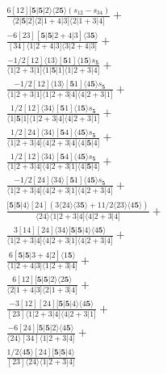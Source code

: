 \documentclass[varwidth, border=5pt]{standalone}
\begin{document}
\begin{my}
$\begin{gathered}
\scriptscriptstyle\frac{6[12][𝟓|𝟓|2⟩⟨2𝟓⟩(s_{12}-s_{34})}{⟨2|𝟓|2]⟨2|1+4|3]⟨2|1+3|4]} +\\
\scriptscriptstyle\frac{-6[23][𝟓|𝟓|2+4|3]⟨3𝟓⟩}{[34]⟨1|2+4|3]⟨3|2+4|3]} +\\
\scriptscriptstyle\frac{-1/2[12]⟨13⟩[𝟓1]⟨1𝟓⟩s_{𝟓}}{⟨1|2+3|1]⟨1|𝟓|1]⟨1|2+3|4]} +\\
\scriptscriptstyle\frac{-1/2[12]⟨13⟩[𝟓1]⟨4𝟓⟩s_{𝟓}}{⟨1|2+3|1]⟨1|2+3|4]⟨4|2+3|1]} +\\
\scriptscriptstyle\frac{1/2[12]⟨34⟩[𝟓1]⟨1𝟓⟩s_{𝟓}}{⟨1|𝟓|1]⟨1|2+3|4]⟨4|2+3|1]} +\\
\scriptscriptstyle\frac{1/2[24]⟨34⟩[𝟓4]⟨4𝟓⟩s_{𝟓}}{⟨1|2+3|4]⟨4|2+3|4]⟨4|𝟓|4]} +\\
\scriptscriptstyle\frac{1/2[12]⟨34⟩[𝟓4]⟨4𝟓⟩s_{𝟓}}{⟨1|2+3|4]⟨4|2+3|1]⟨4|𝟓|4]} +\\
\scriptscriptstyle\frac{-1/2[24]⟨34⟩[𝟓1]⟨4𝟓⟩s_{𝟓}}{⟨1|2+3|4]⟨4|2+3|1]⟨4|2+3|4]} +\\
\scriptscriptstyle\frac{[𝟓|𝟓|4⟩[24](3⟨24⟩⟨3𝟓⟩+11/2⟨23⟩⟨4𝟓⟩)}{⟨24⟩⟨1|2+3|4]⟨4|2+3|4]} +\\
\scriptscriptstyle\frac{3[14][24]⟨34⟩[𝟓|𝟓|4⟩⟨4𝟓⟩}{⟨1|2+3|4]⟨4|2+3|1]⟨4|2+3|4]} +\\
\scriptscriptstyle\frac{6[𝟓|𝟓|3+4|2]⟨1𝟓⟩}{⟨1|2+4|3]⟨1|2+3|4]} +\\
\scriptscriptstyle\frac{6[12][𝟓|𝟓|2⟩⟨2𝟓⟩}{⟨2|1+4|3]⟨2|1+3|4]} +\\
\scriptscriptstyle\frac{-3[12][24][𝟓|𝟓|4⟩⟨4𝟓⟩}{[23]⟨1|2+3|4]⟨4|2+3|1]} +\\
\scriptscriptstyle\frac{-6[24][𝟓|𝟓|2⟩⟨4𝟓⟩}{⟨24⟩[34]⟨1|2+3|4]} +\\
\scriptscriptstyle\frac{1/2⟨4𝟓⟩[24][𝟓|𝟓|4⟩}{[23]⟨24⟩⟨1|2+3|4]} \phantom{+}
\end{gathered}$
\end{my}
\end{document}

